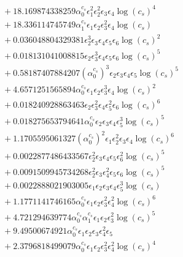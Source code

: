 \documentclass[10pt]{article}
\begin{document}
\begin{align*}
&{}  + 18.169874338259 \alpha_{0}^{c_s} \epsilon_{1}^{2} \epsilon_{2}^{2} \epsilon_{3} \epsilon_{4} \log{\left(c_{s} \right)}^{4} \\
&{}  + 18.336114745749 \alpha_{1}^{c_s} \epsilon_{1} \epsilon_{2} \epsilon_{3}^{2} \epsilon_{4} \log{\left(c_{s} \right)} \\
&{}  + 0.036048804329381 \epsilon_{2}^{3} \epsilon_{3} \epsilon_{4} \epsilon_{5} \epsilon_{6} \log{\left(c_{s} \right)}^{2} \\
&{}  + 0.018131041008815 \epsilon_{2} \epsilon_{3}^{3} \epsilon_{4} \epsilon_{5} \epsilon_{6} \log{\left(c_{s} \right)}^{5} \\
&{}  + 0.58187407884207 \left(\alpha_{0}^{c_s}\right)^{3} \epsilon_{2} \epsilon_{3} \epsilon_{4} \epsilon_{5} \log{\left(c_{s} \right)}^{5} \\
&{}  + 4.6571251565894 \alpha_{0}^{c_s} \epsilon_{1} \epsilon_{2} \epsilon_{3}^{3} \epsilon_{4} \log{\left(c_{s} \right)}^{2} \\
&{}  + 0.018240928863463 \epsilon_{2} \epsilon_{3}^{2} \epsilon_{4} \epsilon_{5}^{2} \epsilon_{6} \log{\left(c_{s} \right)}^{6} \\
&{}  + 0.018275653794641 \alpha_{0}^{c_s} \epsilon_{2} \epsilon_{3} \epsilon_{4} \epsilon_{5}^{3} \log{\left(c_{s} \right)}^{5} \\
&{}  + 1.1705595061327 \left(\alpha_{0}^{c_s}\right)^{2} \epsilon_{1} \epsilon_{2}^{2} \epsilon_{3} \epsilon_{4} \log{\left(c_{s} \right)}^{6} \\
&{}  + 0.0022877486433567 \epsilon_{2}^{2} \epsilon_{3} \epsilon_{4} \epsilon_{5} \epsilon_{6}^{2} \log{\left(c_{s} \right)}^{5} \\
&{}  + 0.0091509945734268 \epsilon_{2}^{2} \epsilon_{3} \epsilon_{4}^{2} \epsilon_{5} \epsilon_{6} \log{\left(c_{s} \right)}^{5} \\
&{}  + 0.0022888021903005 \epsilon_{1} \epsilon_{2} \epsilon_{3} \epsilon_{4} \epsilon_{5}^{3} \log{\left(c_{s} \right)} \\
&{}  + 1.1771141746165 \alpha_{0}^{c_s} \epsilon_{1} \epsilon_{2} \epsilon_{3}^{2} \epsilon_{4}^{2} \log{\left(c_{s} \right)}^{6} \\
&{}  + 4.721294639774 \alpha_{0}^{c_s} \alpha_{1}^{c_s} \epsilon_{1} \epsilon_{2} \epsilon_{3}^{2} \log{\left(c_{s} \right)}^{5} \\
&{}  + 9.49500674921 \alpha_{0}^{c_s} \epsilon_{1} \epsilon_{2} \epsilon_{3} \epsilon_{4}^{2} \epsilon_{5} \\
&{}  + 2.3796818499079 \alpha_{0}^{c_s} \epsilon_{1} \epsilon_{2} \epsilon_{3}^{2} \epsilon_{4}^{2} \log{\left(c_{s} \right)}^{4} \\

\end{align*}
\end{document}
